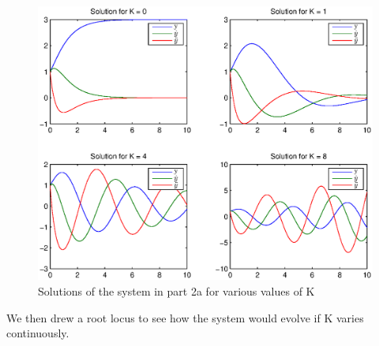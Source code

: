 \begin{figure}
\begin{center}
\includegraphics[scale=0.5]{result21.eps}
\caption{Solutions of the system in part 2a for various values of K}
\label{result21}
\end{center}
\end{figure}

We then drew a root locus to see how the system would evolve if K varies continuously. 


